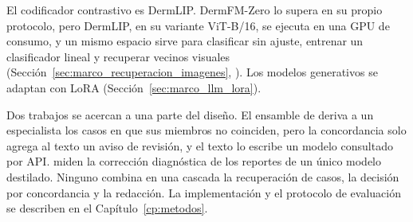 El codificador contrastivo es DermLIP. DermFM-Zero lo supera en su propio protocolo, pero DermLIP, en su variante
ViT-B/16, se ejecuta en una GPU de consumo, y un mismo espacio sirve para clasificar sin ajuste, entrenar un
clasificador lineal y recuperar vecinos visuales (Sección~\ref{sec:marco_recuperacion_imagenes},
\cite{yan2025derm1miccv}). Los modelos generativos se adaptan con LoRA (Sección~\ref{sec:marco_llm_lora}).

Dos trabajos se acercan a una parte del diseño. El ensamble de \textcite{khan2025ensemble} deriva a un especialista
los casos en que sus miembros no coinciden, pero la concordancia solo agrega al texto un aviso de revisión, y el
texto lo escribe un modelo consultado por API. \textcite{chakrabarti2025skin} miden la corrección diagnóstica de los reportes de un único
modelo destilado. Ninguno combina en una cascada la recuperación de casos, la decisión por concordancia y la
redacción. La implementación y el protocolo de evaluación se describen en el Capítulo~\ref{cp:metodos}.

\FloatBarrier
